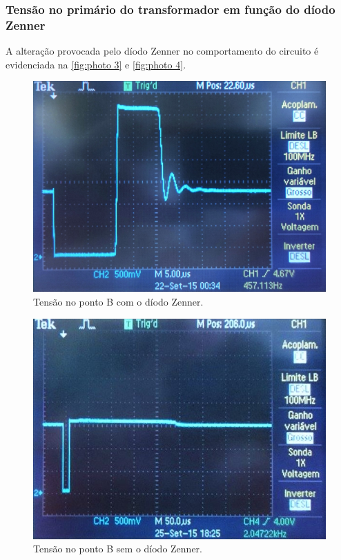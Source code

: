 \documentclass[a4paper,11pt]{article}
\numberwithin{equation}{section}
\begin{document}
\subsubsection{Tensão no primário do transformador em função do díodo Zenner}

A alteração provocada pelo díodo Zenner no comportamento do circuito é evidenciada na \autoref{fig:photo 3} e \autoref{fig:photo 4}.

\pagebreak

\begin{figure}[h]
	\centering
	\includegraphics[keepaspectratio=true, scale=0.15]{img/DSC0118}
	\caption{Tensão no ponto B com o díodo Zenner.}
	\label{fig:photo 3}
	\vspace{-0.8em}
\end{figure}

\begin{figure}[h]
	\vspace{3mm}
	\centering
	\includegraphics[keepaspectratio=true, scale=0.63]{img/fig7}
	\caption{Tensão no ponto B sem o díodo Zenner.}
	\label{fig:photo 4}
	\vspace{-0.8em}
\end{figure}
\end{document}
